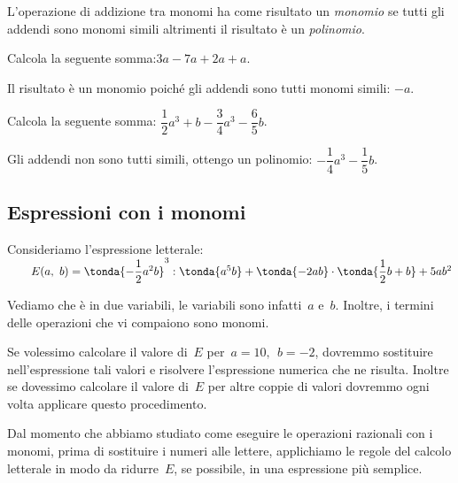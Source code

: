L'operazione di addizione tra monomi ha come risultato 
un \emph{monomio} se tutti gli addendi sono monomi simili altrimenti 
il risultato è un \emph{polinomio}.

\begin{esempio}{}{}
Calcola la seguente somma:\quad \(3a-7a+2a+a\).

Il risultato è un monomio poiché gli addendi sono tutti monomi
simili: \(-a\).
\end{esempio}

\begin{esempio}{}{}
Calcola la seguente somma:\quad 
\(\dfrac{1}{2}a^{3}+b-\dfrac{3}{4}a^{3}-\dfrac{6}{5}b\).

Gli addendi non sono tutti simili, ottengo un polinomio: \quad
\(-{\dfrac{1}{4}}a^{3}-\dfrac{1}{5}b\).
\end{esempio}


\subsection{Espressioni con i monomi}
\label{subsec:monomi_espressioni}

\noindent Consideriamo l'espressione letterale: \\ 
\(\qquad E(a,~b)=\tonda{-{\dfrac{1}{2}}a^{2}b}^{3}:\tonda{a^{5}b}+
  \tonda{-2ab}\cdot\tonda{\dfrac{1}{2}b+b}+5ab^{2}\)

Vediamo che è in due variabili, le variabili sono infatti~\(a\) e~\(b\). 
Inoltre, i termini delle operazioni che vi compaiono sono monomi.

Se volessimo calcolare il valore di~\(E\) per~\(a = 10,~~b = -2\), 
dovremmo sostituire nell'espressione tali valori e risolvere
l'espressione numerica che ne risulta. 
Inoltre se dovessimo calcolare il valore di~\(E\) per altre coppie di 
valori dovremmo ogni volta applicare questo procedimento.

Dal momento che abbiamo studiato come eseguire le operazioni razionali
con i monomi, prima di sostituire i numeri alle lettere, applichiamo le
regole del calcolo letterale in modo da ridurre~\(E\), se possibile, 
in una espressione più semplice.


